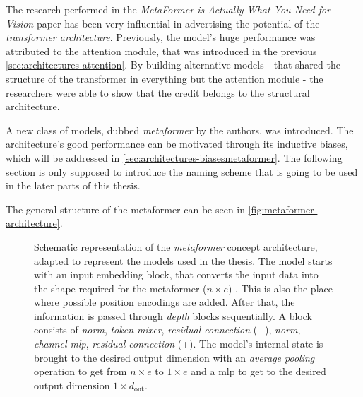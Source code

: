 The research performed in the \emph{MetaFormer is Actually What You Need for Vision} paper \cite{metaformerPaper} has been very influential in advertising the potential of the \emph{transformer architecture}.
Previously, the model's huge performance was attributed to the attention module, that was introduced in the previous \autoref{sec:architectures-attention}. 
By building alternative models - that shared the structure of the transformer in everything but the attention module - the researchers were able to show that the credit belongs to the structural architecture.

A new class of models, dubbed \emph{metaformer} by the authors, was introduced. 
The architecture's good performance can be motivated through its inductive biases, which will be addressed in \autoref{sec:architectures-biasesmetaformer}.
The following section is only supposed to introduce the naming scheme that is going to be used in the later parts of this thesis.

The general structure of the metaformer can be seen in \autoref{fig:metaformer-architecture}.

\begin{figure}[htbp]
    \centering
    \caption{Schematic representation of the \emph{metaformer} concept architecture, adapted to represent the models used in the thesis. 
    The model starts with an input embedding block, that converts the input data into the shape required for the metaformer ($n\times e$) \cite{imageWorth16x16}. This is also the place where possible position encodings are added. 
    After that, the information is passed through \emph{depth} blocks sequentially. 
    A block consists of \emph{norm}, \emph{token mixer}, \emph{residual connection} (+), 
    \emph{norm}, \emph{channel mlp}, \emph{residual connection} (+).
    The model's internal state is brought to the desired output dimension with an \emph{average pooling} operation to get from $n \times e$ to $1 \times e$ and a mlp to get to the desired output dimension $1 \times d_\mathrm{out}$.
    }
    \label{fig:metaformer-architecture}
\end{figure}

